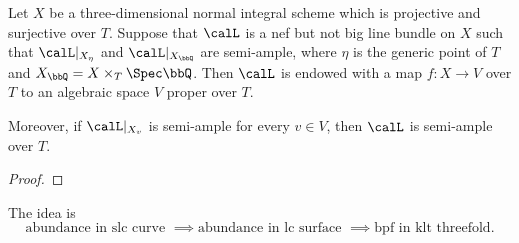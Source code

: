     \begin{lemma}\label{lem:fiber_wise_base_point_free}
        Let \(X\) be a three-dimensional normal integral scheme which is projective and surjective over \(T\).
        Suppose that \(\calL\) is a nef but not big line bundle on \(X\) such that \(\calL|_{X_\eta}\) and \(\calL|_{X_{\bbQ}}\) are semi-ample, where \(\eta\) is the generic point of \(T\) and \(X_{\bbQ} = X \times_T \Spec \bbQ\).
        Then \(\calL\) is endowed with a map \(f: X \to V\) over \(T\) to an algebraic space \(V\) proper over \(T\).

        Moreover, if \(\calL|_{X_v}\) is semi-ample for every \(v \in V\), then \(\calL\) is semi-ample over \(T\).
    \end{lemma}
    \begin{proof}
        
    \end{proof}

    The idea is 
    \[ \text{abundance in slc curve } \implies \text{abundance in lc surface } \implies \text{bpf in klt threefold}. \]


